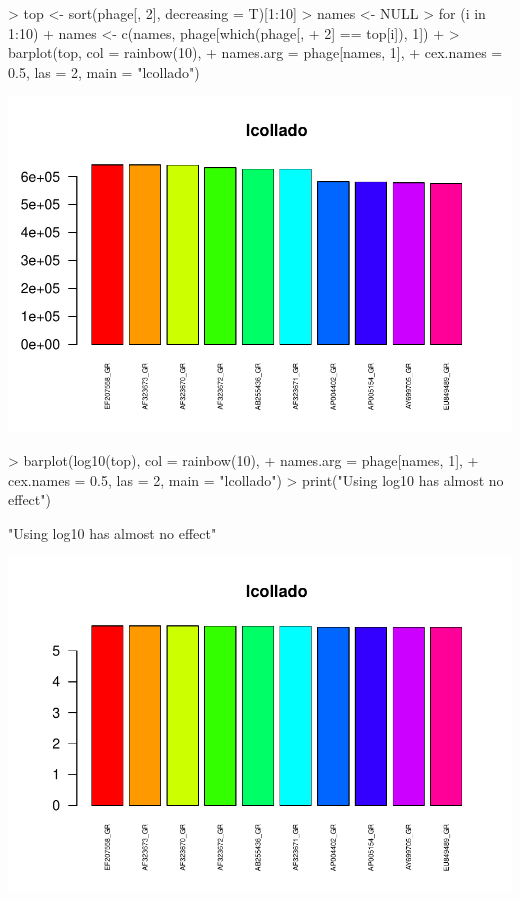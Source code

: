 \documentclass[letterpaper,12pt]{article}
\begin{document}
\begin{itemize}
\begin{enumerate}
\begin{Schunk}
\begin{Sinput}
> top <- sort(phage[, 2], decreasing = T)[1:10]
> names <- NULL
> for (i in 1:10) {
+     names <- c(names, phage[which(phage[, 
+         2] == top[i]), 1])
+ }
> barplot(top, col = rainbow(10), 
+     names.arg = phage[names, 1], 
+     cex.names = 0.5, las = 2, main = "lcollado")
\end{Sinput}
\end{Schunk}
\includegraphics{plots/fig-011}
\begin{Schunk}
\begin{Sinput}
> barplot(log10(top), col = rainbow(10), 
+     names.arg = phage[names, 1], 
+     cex.names = 0.5, las = 2, main = "lcollado")
> print("Using log10 has almost no effect")
\end{Sinput}
\begin{Soutput}
[1] "Using log10 has almost no effect"
\end{Soutput}
\end{Schunk}
\includegraphics{plots/fig-012}
  \end{enumerate}
  \end{itemize}
\end{document}
